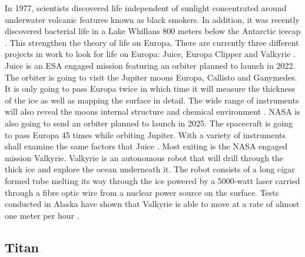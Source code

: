 \begin{multicols}{2}
In 1977, scientists discovered life independent of sunlight concentrated around underwater volcanic features known as black smokers.
In addition, it was recently discovered bacterial life in a Lake Whillans 800 meters below the Antarctic icecap \cite{FPlan04}. This strengthen the theory of life on Europa.
There are currently three different projects in work to look for life on Europa: Juice, Europa Clipper and Valkyrie \cite{FPlan24}.
Juice is an ESA engaged mission featuring an orbiter planned to launch in 2022.
The orbiter is going to visit the Jupiter moons Europa, Callisto and Ganymedes.
It is only going to pass Europa twice in which time it will measure the thickness of the ice as well as mapping the surface in detail.
The wide range of instruments will also reveal the moons internal structure and chemical environment \cite{FPlan24}.
NASA is also going to send an orbiter planned to launch in 2025.
The spacecraft is going to pass Europa 45 times while orbiting Jupiter.
With a variety of instruments shall examine the same factors that Juice \cite{FPlan24}.
Most exiting is the NASA engaged mission Valkyrie.
Valkyrie is an autonomous robot that will drill through the thick ice and explore the ocean underneath it.
The robot consists of a long cigar formed tube melting its way through the ice powered by a 5000-watt laser carried through a fibre optic wire from a nuclear power source on the surface.
Tests conducted in Alaska have shown that Valkyrie is able to move at a rate of almost one meter per hour \cite{FPlan24} \cite{FPlan25}.

\subsection*{Titan}
 

\end{multicols}
